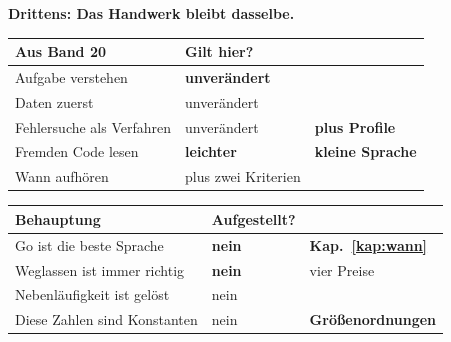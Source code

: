 \begin{merksatz}
\textbf{Drittens: Das Handwerk bleibt dasselbe.}

\begin{center}
\renewcommand{\arraystretch}{1.5}
\begin{tabular}{@{}P{3.0cm}P{2.2cm}P{2.6cm}@{}}
\toprule
\textbf{Aus Band 20} & \textbf{Gilt hier?} & \\
\midrule
Aufgabe verstehen & \textcolor{gruen}{\textbf{unverändert}} & \\
Daten zuerst & \textcolor{gruen}{unverändert} & \\
Fehlersuche als Verfahren & \textcolor{gruen}{unverändert} & \textbf{plus Profile}\\
Fremden Code lesen & \textcolor{gruen}{\textbf{leichter}} & \textcolor{gruen}{\textbf{kleine Sprache}}\\
Wann aufhören & \textcolor{gruen}{plus zwei Kriterien} & \\
\bottomrule
\end{tabular}
\end{center}

\begin{center}
\end{center}

\begin{warnung}
\begin{center}
\renewcommand{\arraystretch}{1.5}
\begin{tabular}{@{}P{3.6cm}P{2.2cm}P{2.0cm}@{}}
\toprule
\textbf{Behauptung} & \textbf{Aufgestellt?} & \\
\midrule
Go ist die beste Sprache & \textcolor{akzent}{\textbf{nein}} & \textbf{Kap.~\ref{kap:wann}}\\
Weglassen ist immer richtig & \textcolor{akzent}{\textbf{nein}} & \textcolor{akzent}{vier Preise}\\
Nebenläufigkeit ist gelöst & \textcolor{akzent}{nein} & \\
Diese Zahlen sind Konstanten & \textcolor{akzent}{nein} & \textbf{Größen\-ordnungen}\\
\bottomrule
\end{tabular}
\end{center}

\begin{center}
\begin{minipage}{0.88\textwidth}
\end{minipage}
\end{center}
\end{warnung}
\end{merksatz}

